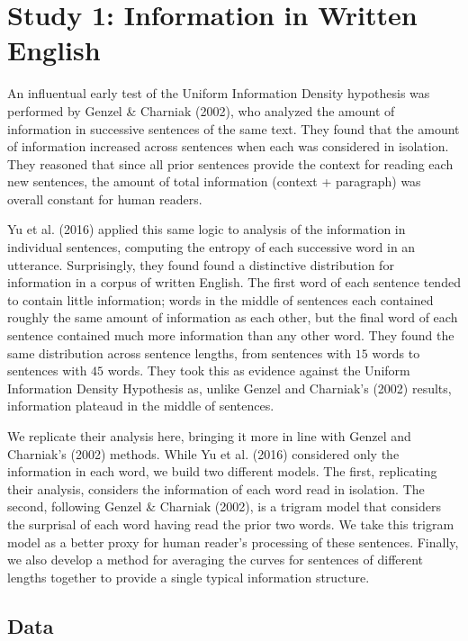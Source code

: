 \documentclass[10pt, letterpaper]{article}
\begin{document}
\hypertarget{study-1-information-in-written-english}{%
\section{Study 1: Information in Written
English}\label{study-1-information-in-written-english}}

An influentual early test of the Uniform Information Density hypothesis
was performed by Genzel \& Charniak (2002), who analyzed the amount of
information in successive sentences of the same text. They found that
the amount of information increased across sentences when each was
considered in isolation. They reasoned that since all prior sentences
provide the context for reading each new sentences, the amount of total
information (context + paragraph) was overall constant for human
readers.

Yu et al. (2016) applied this same logic to analysis of the information
in individual sentences, computing the entropy of each successive word
in an utterance. Surprisingly, they found found a distinctive
distribution for information in a corpus of written English. The first
word of each sentence tended to contain little information; words in the
middle of sentences each contained roughly the same amount of
information as each other, but the final word of each sentence contained
much more information than any other word. They found the same
distribution across sentence lengths, from sentences with \(15\) words
to sentences with \(45\) words. They took this as evidence against the
Uniform Information Density Hypothesis as, unlike Genzel and Charniak's
(2002) results, information plateaud in the middle of sentences.

We replicate their analysis here, bringing it more in line with Genzel
and Charniak's (2002) methods. While Yu et al. (2016) considered only
the information in each word, we build two different models. The first,
replicating their analysis, considers the information of each word read
in isolation. The second, following Genzel \& Charniak (2002), is a
trigram model that considers the surprisal of each word having read the
prior two words. We take this trigram model as a better proxy for human
reader's processing of these sentences. Finally, we also develop a
method for averaging the curves for sentences of different lengths
together to provide a single typical information structure.

\hypertarget{data}{%
\subsection{Data}\label{data}}
\end{document}
